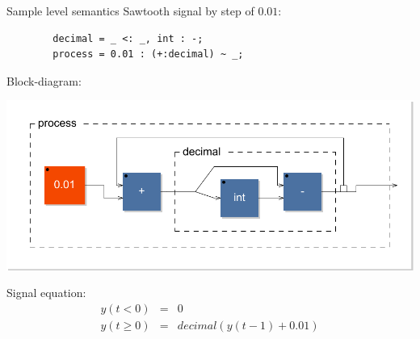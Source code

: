 
\begin{frame}[fragile]{Sample level semantics}
    Sawtooth signal by step of $0.01$:
    \begin{lstlisting}
        decimal = _ <: _, int : -;
        process = 0.01 : (+:decimal) ~ _;
    \end{lstlisting}
    
    Block-diagram:
    \begin{center}
        \includegraphics[scale=0.4]{images/sawtooth-diag}
    \end{center}
    
    Signal equation:
    \begin{eqnarray*}
        y(t<0) & = & 0\\
        y(t\geq 0) & = & decimal(y(t-1) + 0.01)
    \end{eqnarray*}
    
\end{frame}
